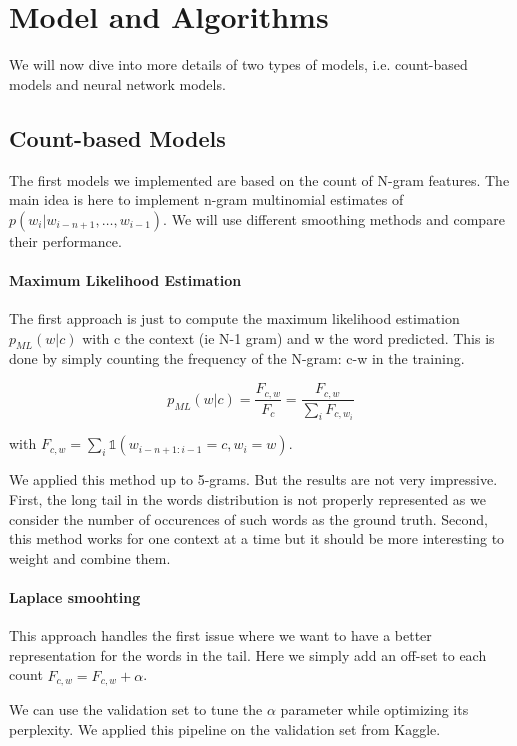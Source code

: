 \documentclass[11pt]{article}
\begin{document}
\section{Model and Algorithms}

We will now dive into more details of two types of models, i.e. count-based models and neural network models.

\subsection{Count-based Models}

The first models we implemented are based on the count of N-gram features. The main idea is here to implement n-gram multinomial estimates of $p(w_i|w_{i-n+1}, \hdots, w_{i-1})$. We will use different smoothing methods and compare their performance.

\paragraph{Maximum Likelihood Estimation}

The first approach is just to compute the maximum likelihood estimation $p_{ML}(w|c)$ with c the context (ie N-1 gram) and w the word predicted. This is done by simply counting the frequency of the N-gram: c-w in the training.

\[
	p_{ML}(w|c) = \frac{F_{c,w}}{F_c} = \frac{F_{c,w}}{\sum_i F_{c,w_i}}
\]

with $ F_{c,w} = \sum_i \mathbb{1}(w_{i-n+1:i-1}=c, w_i=w)$.


We applied this method up to 5-grams. But the results are not very impressive. First, the long tail in the words distribution is not properly represented as we consider the number of occurences of such words as the ground truth. Second, this method works for one context at a time but it should be more interesting to weight and combine them.

\paragraph{Laplace smoohting}

This approach handles the first issue where we want to have a better representation for the words in the tail. Here we simply add an off-set to each count $\hat{F}_{c,w} = F_{c,w} + \alpha $.

We can use the validation set to tune the $\alpha$ parameter while optimizing its perplexity. We applied this pipeline on the validation set from Kaggle.
\end{document}

